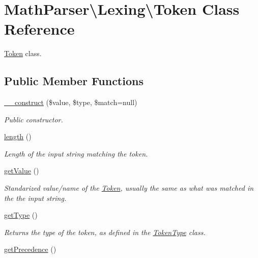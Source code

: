 \hypertarget{classMathParser_1_1Lexing_1_1Token}{\section{Math\-Parser\textbackslash{}Lexing\textbackslash{}Token Class Reference}
\label{classMathParser_1_1Lexing_1_1Token}
}


\hyperlink{classMathParser_1_1Lexing_1_1Token}{Token} class.  


\subsection*{Public Member Functions}
\begin{DoxyCompactItemize}
\item 
\hyperlink{classMathParser_1_1Lexing_1_1Token_a45ded5abf4fef1a2e8938f71d8864491}{\-\_\-\-\_\-construct} (\$value, \$type, \$match=null)
\begin{DoxyCompactList}\small\item\em Public constructor. \end{DoxyCompactList}\item 
\hyperlink{classMathParser_1_1Lexing_1_1Token_abdd998ce6d440c0773fa7fa3616cf79b}{length} ()
\begin{DoxyCompactList}\small\item\em Length of the input string matching the token. \end{DoxyCompactList}\item 
\hyperlink{classMathParser_1_1Lexing_1_1Token_a1dac568b5f1008243edcf1b00d13cf42}{get\-Value} ()
\begin{DoxyCompactList}\small\item\em Standarized value/name of the \hyperlink{classMathParser_1_1Lexing_1_1Token}{Token}, usually the same as what was matched in the the input string. \end{DoxyCompactList}\item 
\hyperlink{classMathParser_1_1Lexing_1_1Token_a695571048ecc4c9bab3c742a676fac67}{get\-Type} ()
\begin{DoxyCompactList}\small\item\em Returns the type of the token, as defined in the \hyperlink{classMathParser_1_1Lexing_1_1TokenType}{Token\-Type} class. \end{DoxyCompactList}\item 
\hyperlink{classMathParser_1_1Lexing_1_1Token_abbb8a5b874586940b6023c53233149b0}{get\-Precedence} ()

\end{DoxyCompactItemize}
